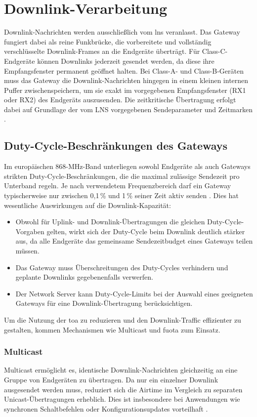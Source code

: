 \section{Downlink-Verarbeitung}

	Downlink-Nachrichten werden ausschlie{\ss}lich vom \ac{lns} veranlasst. Das Gateway fungiert dabei als reine Funkbrücke, die vorbereitete und vollständig verschlüsselte Downlink-Frames an die Endgeräte überträgt. Für Class-C-Endgeräte können Downlinks jederzeit gesendet werden, da diese ihre Empfangsfenster permanent geöffnet halten. Bei Class-A- und Class-B-Geräten muss das Gateway die Downlink-Nachrichten hingegen in einem kleinen internen Puffer zwischenspeichern, um sie exakt im vorgegebenen Empfangsfenster (RX1 oder RX2) des Endgeräts auszusenden. Die zeitkritische Übertragung erfolgt dabei auf Grundlage der vom LNS vorgegebenen Sendeparameter und Zeitmarken  \cite{LoRaAlliance:2020b}.

\subsection{Duty-Cycle-Beschränkungen des Gateways}
	Im europäischen 868-MHz-Band unterliegen sowohl Endgeräte als auch Gateways strikten Duty-Cycle-Beschränkungen, die die maximal zulässige Sendezeit pro Unterband regeln. Je nach verwendetem Frequenzbereich darf ein Gateway typischerweise nur zwischen 0{,}1\,\% und 1\,\% seiner Zeit aktiv senden \cite{ETSI:2018b}. Dies hat wesentliche Auswirkungen auf die Downlink-Kapazität:
\begin{itemize}
	\item Obwohl für Uplink- und Downlink-Übertragungen die gleichen Duty-Cycle-Vorgaben gelten, wirkt sich der Duty-Cycle beim Downlink deutlich stärker aus, da alle Endgeräte das gemeinsame Sendezeitbudget eines Gateways teilen müssen.
	\item Das Gateway muss Überschreitungen des Duty-Cycles verhindern und geplante Downlinks gegebenenfalls verwerfen.
	\item Der Network Server kann Duty-Cycle-Limits bei der Auswahl eines geeigneten Gateways für eine Downlink-Übertragung berücksichtigen.
\end{itemize}

	Um die Nutzung der \ac{toa} zu reduzieren und den Downlink-Traffic effizienter zu gestalten, kommen Mechanismen wie Multicast und \ac{fuota} zum Einsatz.

\subsubsection{Multicast}
	Multicast ermöglicht es, identische Downlink-Nachrichten gleichzeitig an eine Gruppe von Endgeräten zu übertragen. Da nur ein einzelner Downlink ausgesendet werden muss, reduziert sich die Airtime im Vergleich zu separaten Unicast-Übertragungen erheblich. Dies ist insbesondere bei Anwendungen wie synchronen Schaltbefehlen oder Konfigurationsupdates vorteilhaft \cite{USMB:2022}.

